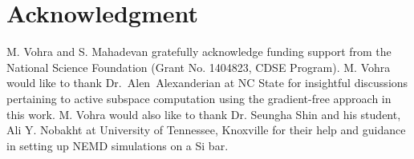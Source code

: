\section*{Acknowledgment}

M. Vohra and S. Mahadevan gratefully acknowledge funding support from the
National Science Foundation (Grant No. 1404823, CDSE Program).
M. Vohra would like to thank Dr.~Alen~Alexanderian at NC State for
insightful discussions pertaining to active subspace computation using
the gradient-free approach in this work. M. Vohra would also like to
thank Dr. Seungha Shin and his student, Ali Y. Nobakht at University of
Tennessee, Knoxville for their help
and guidance in setting up NEMD simulations on a Si bar.  
